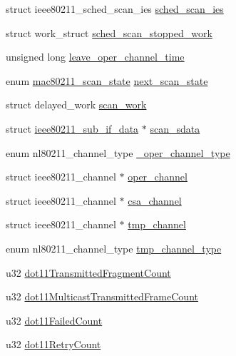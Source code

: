 \begin{DoxyCompactItemize}
\item 
struct ieee80211\-\_\-sched\-\_\-scan\-\_\-ies \hyperlink{structieee80211__local_a1dbb796d0082174e8a7f69314a3bfc90}{sched\-\_\-scan\-\_\-ies}
\item 
struct work\-\_\-struct \hyperlink{structieee80211__local_a0724e881582b025d21006614b3f63066}{sched\-\_\-scan\-\_\-stopped\-\_\-work}
\item 
unsigned long \hyperlink{structieee80211__local_aad9daf693bf88c202d2832eb6500c08d}{leave\-\_\-oper\-\_\-channel\-\_\-time}
\item 
enum \hyperlink{ieee80211__i_8h_a01815f7cfcbae17eee01a64cd3954172}{mac80211\-\_\-scan\-\_\-state} \hyperlink{structieee80211__local_a16e86195a99d4318403d3df1b82adf53}{next\-\_\-scan\-\_\-state}
\item 
struct delayed\-\_\-work \hyperlink{structieee80211__local_a63c27bb90b892d939725e333b3b64514}{scan\-\_\-work}
\item 
struct \hyperlink{structieee80211__sub__if__data}{ieee80211\-\_\-sub\-\_\-if\-\_\-data} $\ast$ \hyperlink{structieee80211__local_aa5cd69a012fd9276c05cfbfccd1e0a51}{scan\-\_\-sdata}
\item 
enum nl80211\-\_\-channel\-\_\-type \hyperlink{structieee80211__local_a89b1771fcea39258509a121d3282d993}{\-\_\-oper\-\_\-channel\-\_\-type}
\item 
struct ieee80211\-\_\-channel $\ast$ \hyperlink{structieee80211__local_a298bcfc61e8403d53c2b492746b765b8}{oper\-\_\-channel}
\item 
struct ieee80211\-\_\-channel $\ast$ \hyperlink{structieee80211__local_a02e1fa5047853fd7b4a5a35afa92afc0}{csa\-\_\-channel}
\item 
struct ieee80211\-\_\-channel $\ast$ \hyperlink{structieee80211__local_a846c2b9126411a975d7cdab2fb50b13e}{tmp\-\_\-channel}
\item 
enum nl80211\-\_\-channel\-\_\-type \hyperlink{structieee80211__local_adaa5be6105e3f31efe60ff88360b891f}{tmp\-\_\-channel\-\_\-type}
\item 
u32 \hyperlink{structieee80211__local_aeb77ef47621fe6375091795cf0ba9719}{dot11\-Transmitted\-Fragment\-Count}
\item 
u32 \hyperlink{structieee80211__local_a3ad6d0afa55ad58821a1c316dc9909ca}{dot11\-Multicast\-Transmitted\-Frame\-Count}
\item 
u32 \hyperlink{structieee80211__local_ab942895683b0fe90f7d2a8bd1eadb04c}{dot11\-Failed\-Count}
\item 
u32 \hyperlink{structieee80211__local_aab5dd2410fd5f8c1e58db5c21f67a7b0}{dot11\-Retry\-Count}

\end{DoxyCompactItemize}
